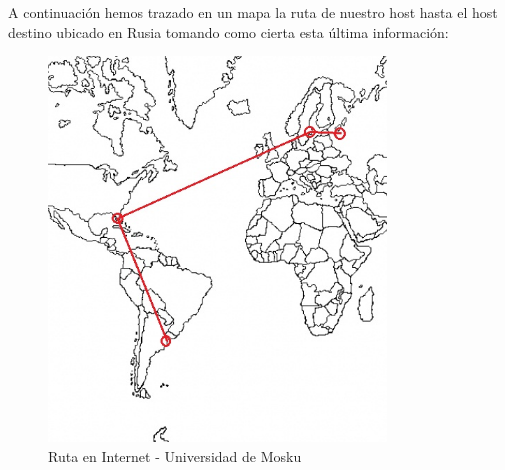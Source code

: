 A continuación hemos trazado en un mapa la ruta de nuestro host hasta el host destino ubicado en Rusia tomando como cierta esta última información:
\begin{figure}[H]
\centering
\includegraphics[width=0.8\textwidth]{graficos/mapa_rusia.jpg}
\caption{Ruta en Internet - Universidad de Mosku}
\label{rusia_zs}
\end{figure}